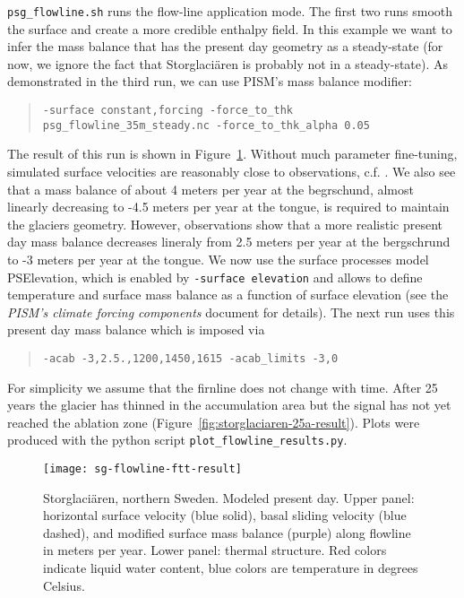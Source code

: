 \texttt{psg_flowline.sh} runs the flow-line application mode. The first two runs smooth the surface and create a more credible enthalpy field. In this example we want to infer the mass balance that has the present day geometry as a steady-state (for now, we ignore the fact that Storglaci{\"a}ren is probably not in a steady-state). As demonstrated in the third run, we can use PISM's mass balance modifier:
\begin{quote}\small
\begin{verbatim}
-surface constant,forcing -force_to_thk psg_flowline_35m_steady.nc -force_to_thk_alpha 0.05
\end{verbatim}
\normalsize\end{quote}
The result of this run is shown in Figure~\ref{fig:storglaciaren-ftt-result}. Without much parameter fine-tuning, simulated surface velocities are reasonably close to observations, c.f. \cite{AschwandenBlatter}.  We also see that a mass balance of about 4 meters per year at the begrschund, almost linearly decreasing to -4.5 meters per year at the tongue, is required to maintain the glaciers geometry. However, observations show that a more realistic present day mass balance decreases lineraly from 2.5 meters per year at the bergschrund to -3 meters per year at the tongue. We now use the surface processes model PSElevation, which is enabled by \texttt{-surface elevation} and allows to define temperature and surface mass balance as a function of surface elevation (see the \emph{PISM's climate forcing components} document for details). The next run uses this present day mass balance which is imposed via 
\begin{quote}\small
\begin{verbatim}
-acab -3,2.5.,1200,1450,1615 -acab_limits -3,0
\end{verbatim}
\normalsize\end{quote} 
For simplicity we assume that the firnline does not change with time. After 25 years the glacier has thinned in the accumulation area but the signal has not yet reached the ablation zone (Figure~\ref{fig:storglaciaren-25a-result}). Plots were produced with the python script \texttt{plot_flowline_results.py}.

\begin{figure}[ht]
  \centering
  \texttt{[image: sg-flowline-ftt-result]}
  \caption{Storglaci{\"a}ren, northern Sweden.  Modeled present day.  Upper panel: horizontal surface velocity (blue solid), basal sliding velocity (blue dashed), and modified surface mass balance (purple) along flowline in meters per year. Lower panel: thermal structure. Red colors indicate liquid water content, blue colors are temperature in degrees Celsius.}
  \label{fig:storglaciaren-ftt-result}
\end{figure}

